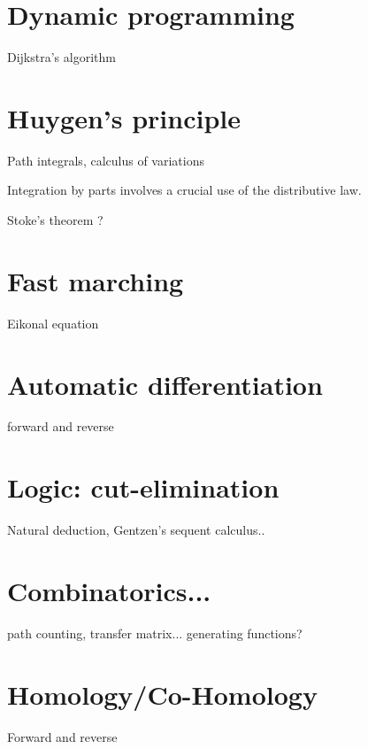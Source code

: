 \documentclass[12pt]{article}
\begin{document}
\section{Dynamic programming}

Dijkstra's algorithm

\section{Huygen's principle}

Path integrals, calculus of variations

Integration by parts involves a crucial use of the distributive law.

Stoke's theorem ? %

\section{Fast marching}

Eikonal equation

\section{Automatic differentiation}

forward and reverse

\section{Logic: cut-elimination}

Natural deduction, Gentzen's sequent calculus..

\section{Combinatorics...}

path counting, transfer matrix...
generating functions?

\section{Homology/Co-Homology}

Forward and reverse


{}

\end{document}
